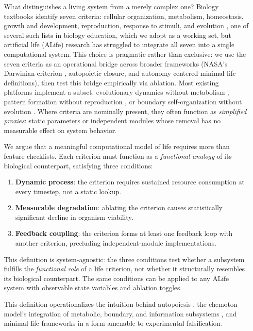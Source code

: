 \documentclass[letterpaper]{article}
\begin{document}
What distinguishes a living system from a merely complex one?
Biology textbooks identify seven criteria: cellular organization, metabolism,
homeostasis, growth and development, reproduction, response to stimuli, and
evolution \citep{urry_2020_campbell}, one of several such lists in biology education, which we adopt as a working set, but artificial life (ALife) research has
struggled to integrate all seven into a single computational system.
This choice is pragmatic rather than exclusive: we use the seven criteria as
an operational bridge across broader frameworks (NASA's Darwinian criterion \citep{joyce_1994_foreword},
autopoietic closure, and autonomy-centered minimal-life definitions), then
test this bridge empirically via ablation.
Most existing platforms implement a subset: evolutionary dynamics without
metabolism \citep{ofria_2004_avida}, pattern formation without reproduction
\citep{chan_2019_lenia}, or boundary self-organization without evolution
\citep{plantec_2023_flow}.
Where criteria are nominally present, they often function as \emph{simplified
proxies}: static parameters or independent modules whose removal has no
measurable effect on system behavior.

We argue that a meaningful computational model of life requires more than
feature checklists.
Each criterion must function as a \emph{functional analogy} of its biological
counterpart, satisfying three conditions:
\begin{enumerate}
  \item \textbf{Dynamic process}: the criterion requires sustained resource
    consumption at every timestep, not a static lookup.
  \item \textbf{Measurable degradation}: ablating the criterion causes
    statistically significant decline in organism viability.
  \item \textbf{Feedback coupling}: the criterion forms at least one feedback
    loop with another criterion, precluding independent-module implementations.
\end{enumerate}
This definition is system-agnostic: the three conditions test whether a subsystem
fulfills the \emph{functional role} of a life criterion, not whether it structurally
resembles its biological counterpart.
The same conditions can be applied to any ALife system with observable state variables
and ablation toggles.

This definition operationalizes the intuition behind autopoiesis
\citep{maturana_1980_autopoiesis}, the chemoton model's integration
of metabolic, boundary, and information subsystems
\citep{ganti_2003_principles}, and minimal-life frameworks
\citep{ruizmirazo_2004_universal} in a form amenable to experimental
falsification.
\end{document}
